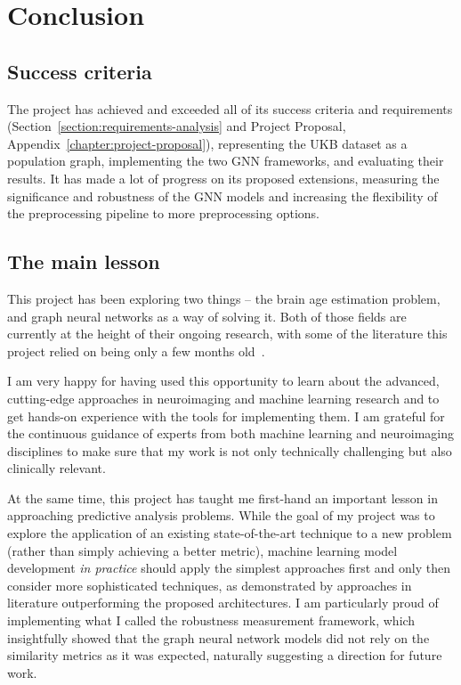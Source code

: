 \chapter{Conclusion}



\section{Success criteria}
The project has achieved and exceeded all of its success criteria and requirements (Section~\ref{section:requirements-analysis} and Project Proposal, Appendix~\ref{chapter:project-proposal}), representing the UKB dataset as a population graph, implementing the two GNN frameworks, and evaluating their results. It has made a lot of progress on its proposed extensions, measuring the significance and robustness of the GNN models and increasing the flexibility of the preprocessing pipeline to more preprocessing options.

\section{The main lesson}
This project has been exploring two things – the brain age estimation problem, and graph neural networks as a way of solving it. Both of those fields are currently at the height of their ongoing research, with some of the literature this project relied on being only a few months old~\cite{kaufmann2019, niu2019improved, pervaiz2020optimising}.

I am very happy for having used this opportunity to learn about the advanced, cutting-edge approaches in neuroimaging and machine learning research and to get hands-on experience with the tools for implementing them. I am grateful for the continuous guidance of experts from both machine learning and neuroimaging disciplines to make sure that my work is not only technically challenging but also clinically relevant. 

At the same time, this project has taught me first-hand an important lesson in approaching predictive analysis problems. While the goal of my project was to explore the application of an existing state-of-the-art technique to a new problem (rather than simply achieving a better metric), machine learning model development \textit{in practice} should apply the simplest approaches first and only then consider more sophisticated techniques, as demonstrated by approaches in literature outperforming the proposed architectures. I am particularly proud of implementing what I called the robustness measurement framework, which insightfully showed that the graph neural network models did not rely on the similarity metrics as it was expected, naturally suggesting a direction for future work.


